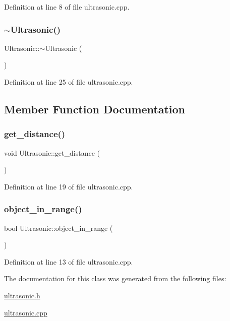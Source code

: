 Definition at line 8 of file ultrasonic.\+cpp.

\mbox{\label{class_ultrasonic_ab5066b2bfeac723140c18b9f8340abad}} 
\subsubsection{\texorpdfstring{$\sim$\+Ultrasonic()}{~Ultrasonic()}}
{\footnotesize\ttfamily Ultrasonic\+::$\sim$\+Ultrasonic (\begin{DoxyParamCaption}{ }\end{DoxyParamCaption})}



Definition at line 25 of file ultrasonic.\+cpp.



\subsection{Member Function Documentation}
\mbox{\label{class_ultrasonic_a3d4ff1956578fb0bec95ee140d30b751}} 
\subsubsection{\texorpdfstring{get\+\_\+distance()}{get\_distance()}}
{\footnotesize\ttfamily void Ultrasonic\+::get\+\_\+distance (\begin{DoxyParamCaption}{ }\end{DoxyParamCaption})}



Definition at line 19 of file ultrasonic.\+cpp.

\mbox{\label{class_ultrasonic_aae6ae7ff42f37a52835dc66bba7e0201}} 
\subsubsection{\texorpdfstring{object\+\_\+in\+\_\+range()}{object\_in\_range()}}
{\footnotesize\ttfamily bool Ultrasonic\+::object\+\_\+in\+\_\+range (\begin{DoxyParamCaption}{ }\end{DoxyParamCaption})}



Definition at line 13 of file ultrasonic.\+cpp.



The documentation for this class was generated from the following files\+:\begin{DoxyCompactItemize}
\item 
\mbox{\hyperlink{ultrasonic_8h}{ultrasonic.\+h}}\item 
\mbox{\hyperlink{ultrasonic_8cpp}{ultrasonic.\+cpp}}\end{DoxyCompactItemize}
